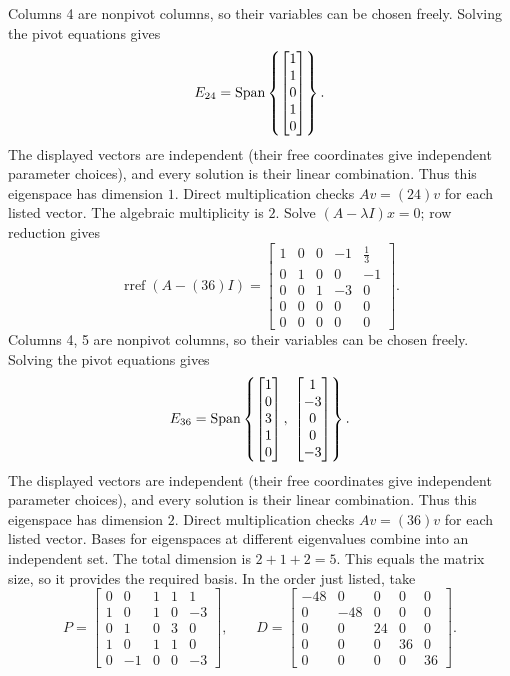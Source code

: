 Columns 4 are nonpivot columns, so their variables can be chosen freely. Solving the pivot equations gives
\[E_{24}=\operatorname{Span}\left\{\begin{bmatrix}1\\1\\0\\1\\0\end{bmatrix}\right\}.\]
The displayed vectors are independent (their free coordinates give independent parameter choices), and every solution is their linear combination. Thus this eigenspace has dimension $1$. Direct multiplication checks $Av=(24)v$ for each listed vector.
The algebraic multiplicity is $2$. Solve $(A-\lambda I)x=0$; row reduction gives
\[\operatorname{rref}(A-(36)I)=\begin{bmatrix}1&0&0&-1&\frac{1}{3}\\0&1&0&0&-1\\0&0&1&-3&0\\0&0&0&0&0\\0&0&0&0&0\end{bmatrix}.\]
Columns 4, 5 are nonpivot columns, so their variables can be chosen freely. Solving the pivot equations gives
\[E_{36}=\Span\left\{\begin{bmatrix}1\\0\\3\\1\\0\end{bmatrix},\ \begin{bmatrix}1\\-3\\0\\0\\-3\end{bmatrix}\right\}.\]
The displayed vectors are independent (their free coordinates give independent parameter choices), and every solution is their linear combination. Thus this eigenspace has dimension $2$. Direct multiplication checks $Av=(36)v$ for each listed vector.
Bases for eigenspaces at different eigenvalues combine into an independent set. The total dimension is $2+1+2=5$.
This equals the matrix size, so it provides the required basis. In the order just listed, take
\[P=\begin{bmatrix}0&0&1&1&1\\1&0&1&0&-3\\0&1&0&3&0\\1&0&1&1&0\\0&-1&0&0&-3\end{bmatrix},\qquad D=\begin{bmatrix}-48&0&0&0&0\\0&-48&0&0&0\\0&0&24&0&0\\0&0&0&36&0\\0&0&0&0&36\end{bmatrix}.\]
